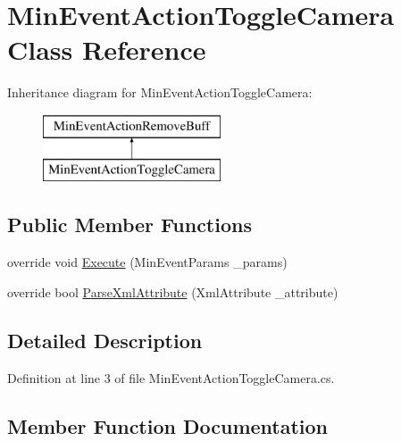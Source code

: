 \hypertarget{class_min_event_action_toggle_camera}{}\section{Min\+Event\+Action\+Toggle\+Camera Class Reference}
\label{class_min_event_action_toggle_camera}
Inheritance diagram for Min\+Event\+Action\+Toggle\+Camera\+:\begin{figure}[H]
\begin{center}
\leavevmode
\includegraphics[height=2.000000cm]{db/d83/class_min_event_action_toggle_camera}
\end{center}
\end{figure}
\subsection*{Public Member Functions}
\begin{DoxyCompactItemize}
\item 
override void \mbox{\hyperlink{class_min_event_action_toggle_camera_aa548a12db0ee78dcffcbaef579a21213}{Execute}} (Min\+Event\+Params \+\_\+params)
\item 
override bool \mbox{\hyperlink{class_min_event_action_toggle_camera_accf1db5c6da943b8112bda03eba4d453}{Parse\+Xml\+Attribute}} (Xml\+Attribute \+\_\+attribute)
\end{DoxyCompactItemize}


\subsection{Detailed Description}


Definition at line 3 of file Min\+Event\+Action\+Toggle\+Camera.\+cs.



\subsection{Member Function Documentation}
\mbox{\label{class_min_event_action_toggle_camera_aa548a12db0ee78dcffcbaef579a21213}} 
